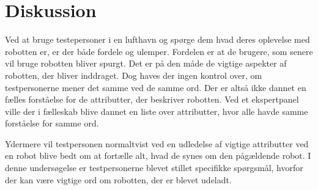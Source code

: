 \section*{Diskussion}
\label{Diskussion}
%
Ved at bruge testepersoner i en lufthavn og spørge dem hvad deres oplevelse med robotten er, er der både fordele og ulemper. Fordelen er at de brugere, som senere vil bruge robotten bliver spurgt. Det er på den måde de vigtige aspekter af robotten, der bliver inddraget. Dog haves der ingen kontrol over, om testpersonerne mener det samme ved de samme ord. Der er altså ikke dannet en fælles forståelse for de attributter, der beskriver robotten. Ved et ekspertpanel ville der i fælleskab blive dannet en liste over attributter, hvor alle havde samme forståelse for samme ord. 

Ydermere vil testpersonen normaltvist ved en udledelse af vigtige attributter ved en robot blive bedt om at fortælle alt, hvad de synes om den pågældende robot. I denne undersøgelse er testpersonerne blevet stillet specifikke spørgsmål, hvorfor der kan være vigtige ord om robotten, der er blevet udeladt.  
